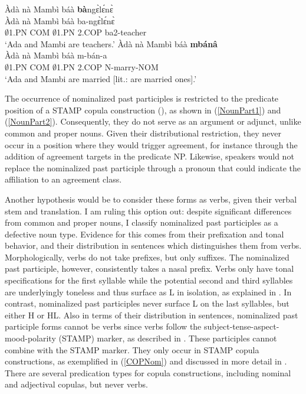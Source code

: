 \begin{exe}
\ex\label{NounPart2} 
\begin{xlist}
\ex\label{NounPart2a} 
\glll Àdà nà Mambì báà {\bfseries bà}ngɛ̀lɛ́nɛ̀ \\
 Àdà nà Mambì báà ba-ngɛ̀lɛ́nɛ̀ \\
$\emptyset$1.PN COM $\emptyset$1.PN 2.COP ba2-teacher \\
\trans `Ada and Mambi are teachers.'
\ex\label{NounPart2b} 
\glll Àdà nà Mambì báà {\bfseries mbánâ} \\
 Àdà nà Mambì báà m-bán-a \\
$\emptyset$1.PN COM $\emptyset$1.PN 2.COP N-marry-NOM \\
\trans `Ada and Mambi are married [lit.: are married ones].'
\end{xlist}
\end{exe}


The occurrence of nominalized past participles is restricted to the predicate position of a STAMP copula construction (), as shown in (\ref{NounPart1}) and (\ref{NounPart2}). Consequently, they do not serve as an argument or adjunct, unlike common and proper nouns. Given their distributional restriction, they never occur in a position where they would trigger agreement, for instance through the addition of agreement targets in the predicate NP. Likewise, speakers would not replace the nominalized past participle through a pronoun that could indicate the affiliation to an agreement class. 

Another hypothesis would be to consider these forms as verbs, given their verbal stem and translation. I am ruling this option out: despite significant differences from common and proper nouns,  I classify nominalized past participles as a defective noun type. Evidence for this comes from their prefixation and tonal behavior, and their distribution in sentences which distinguishes them from verbs.   Morphologically, verbs do not take prefixes, but only suffixes. The nominalized past participle, however, consistently takes a nasal prefix. Verbs only have tonal specifications for the first syllable while the potential second and third syllables are underlyingly toneless and thus surface as L in isolation, as explained in . In contrast, nominalized past participles never surface L on the last syllables, but either H or HL.  Also in terms of their distribution in sentences, nominalized past participle forms cannot be verbs since verbs follow the subject-tense-aspect-mood-polarity (STAMP) marker, as described in . These participles cannot combine with the STAMP marker. They only occur in STAMP copula constructions, as exemplified in (\ref{COPNom}) and discussed in more detail in . There are several predication types for copula constructions, including nominal and adjectival copulas, but never verbs.

